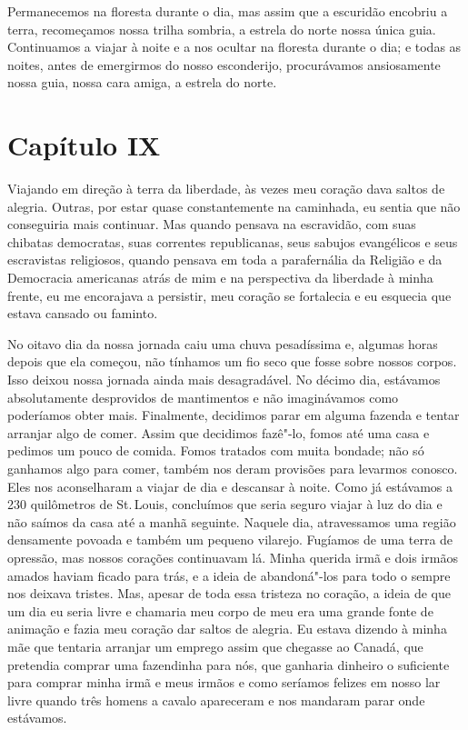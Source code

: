 Permanecemos na floresta durante o dia, mas assim que a escuridão
encobriu a terra, recomeçamos nossa trilha sombria, a estrela do norte
nossa única guia. Continuamos a viajar à noite e a nos ocultar na
floresta durante o dia; e todas as noites, antes de emergirmos do nosso
esconderijo, procurávamos ansiosamente nossa guia, nossa cara amiga, a
estrela do norte.

\chapter*{Capítulo IX}

Viajando em direção à terra da liberdade, às vezes meu coração dava
saltos de alegria. Outras, por estar quase constantemente na caminhada,
eu sentia que não conseguiria mais continuar. Mas quando pensava na
escravidão, com suas chibatas democratas, suas correntes republicanas,
seus sabujos evangélicos e seus escravistas religiosos, quando pensava
em toda a parafernália da Religião e da Democracia americanas atrás de
mim e na perspectiva da liberdade à minha frente, eu me encorajava a
persistir, meu coração se fortalecia e eu esquecia que estava cansado ou
faminto.

No oitavo dia da nossa jornada caiu uma chuva pesadíssima e, algumas
horas depois que ela começou, não tínhamos um fio seco que fosse sobre
nossos corpos. Isso deixou nossa jornada ainda mais desagradável. No
décimo dia, estávamos absolutamente desprovidos de mantimentos e não
imaginávamos como poderíamos obter mais. Finalmente, decidimos parar 
em alguma fazenda e tentar arranjar algo de comer. Assim que decidimos
fazê"-lo, fomos até uma casa e pedimos um pouco de comida. Fomos tratados
com muita bondade; não só ganhamos algo para comer, também nos deram
provisões para levarmos conosco. Eles nos aconselharam a viajar de dia e
descansar à noite. Como já estávamos a 230 quilômetros de St.\,Louis,
concluímos que seria seguro viajar à luz do dia e não saímos da casa até
a manhã seguinte. Naquele dia, atravessamos uma região densamente
povoada e também um pequeno vilarejo. Fugíamos de uma terra de opressão,
mas nossos corações continuavam lá. Minha querida irmã e dois irmãos
amados haviam ficado para trás, e a ideia de abandoná"-los para todo o
sempre nos deixava tristes. Mas, apesar de toda essa tristeza no
coração, a ideia de que um dia eu seria livre e chamaria meu corpo de
meu era uma grande fonte de animação e fazia meu coração dar saltos de
alegria. Eu estava dizendo à minha mãe que tentaria arranjar um emprego
assim que chegasse ao Canadá, que pretendia comprar uma fazendinha para
nós, que ganharia dinheiro o suficiente para comprar minha irmã e meus
irmãos e como seríamos felizes em nosso lar livre quando três homens a
cavalo apareceram e nos mandaram parar onde estávamos.

